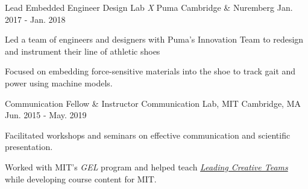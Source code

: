 \begin{cventries}
 \cventry
    {Lead Embedded Engineer} %
    {Design Lab \textit{X} Puma} %
    {Cambridge \& Nuremberg} %
    {Jan. 2017 - Jan. 2018} %
    {
      \begin{cvitems} %
        \item {Led a team of engineers and designers with Puma's Innovation Team to redesign and instrument their line of athletic shoes}
        \item {Focused on embedding force-sensitive materials into the shoe to track gait and power using machine models.}
      \end{cvitems}
    }

  \cventry
    {Communication Fellow \& Instructor} %
    {Communication Lab, MIT} %
    {Cambridge, MA} %
    {Jun. 2015 - May. 2019} %
    {
      \begin{cvitems} %
        \item {Facilitated workshops and seminars on effective communication and scientific presentation.}
        \item {Worked with MIT's \textit{GEL} program and helped teach \href{Leading Creative Teams}{\textit{Leading Creative Teams}} while developing course content for MIT.}
      \end{cvitems}
    }
\end{cventries}
